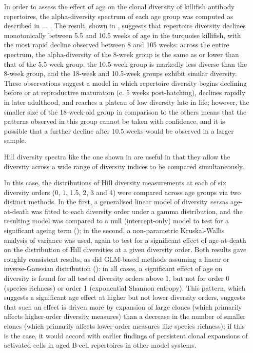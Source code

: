 In order to assess the effect of age on the clonal diversity of killifish antibody repertoires, the alpha-diversity spectrum of each age group was computed as described in ... . The result, shown in , suggests that repertoire diversity declines monotonically between 5.5 and 10.5 weeks of age in the turquoise killifish, with the most rapid decline observed between 8 and 105 weeks: across the entire spectrum, the alpha-diversity of the 8-week group is the same as or lower than that of the 5.5 week group, the 10.5-week group is markedly less diverse than the 8-week group, and the 18-week and 10.5-week groups exhibit similar diversity. These observations suggest a model in which repertoire diversity begins declining before or at reproductive maturation (c. 5 weeks post-hatching), declines rapidly in later adulthood, and reaches a plateau of low diversity late in life; however, the smaller size of the 18-week-old group in comparison to the others means that the patterns observed in this group cannot be taken with confidence, and it is possible that a further decline after 10.5 weeks would be observed in a larger sample.

Hill diversity spectra like the one shown in  are useful in that they allow the diversity across a wide range of diversity indices to be compared simultaneously. 


In this case, the distributions of Hill diversity measurements at each of six diversity orders (0, 1, 1.5, 2, 3 and 4) were compared across age groups via two distinct methods. In the first, a generalised linear model of diversity \textit{versus} age-at-death was fitted to each diversity order under a gamma distribution, and the resulting model was compared to a null (intercept-only) model to test for a significant ageing term (); in the second, a non-parametric Kruskal-Wallis analysis of variance was used, again to test for a significant effect of age-at-death on the distribution of Hill diversities at a given diversity order. Both results gave roughly consistent results, as did GLM-based methods assuming a linear or inverse-Gaussian distribution (): in all cases, a significant effect of age on diversity is found for all tested diversity orders above 1, but not for order 0 (species richness) or order 1 (exponential Shannon entropy). This pattern, which suggests a significant age effect at higher but not lower diversity orders, suggests that such an effect is driven more by expansion of large clones (which primarily affects higher-order diversity measures) than a decrease in the number of smaller clones (which primarily affects lower-order measures like species richness); if this is the case, it would accord with earlier findings of persistent clonal expansions of activated cells in aged B-cell repertoires in other model systems. %

